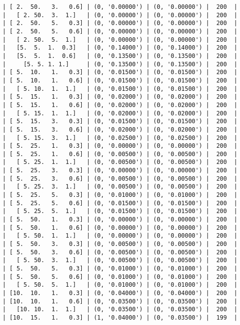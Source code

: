 \documentclass{article}
\begin{document}
\begin{verbatim}
| [ 2.  50.   3.   0.6] | (0, '0.00000') | (0, '0.00000') |  200  |
|   [ 2. 50.  3.  1.]   | (0, '0.00000') | (0, '0.00000') |  200  |
| [ 2.  50.   5.   0.3] | (0, '0.00000') | (0, '0.00000') |  200  |
| [ 2.  50.   5.   0.6] | (0, '0.00000') | (0, '0.00000') |  200  |
|   [ 2. 50.  5.  1.]   | (0, '0.00000') | (0, '0.00000') |  200  |
|   [5.  5.  1.  0.3]   | (0, '0.14000') | (0, '0.14000') |  200  |
|   [5.  5.  1.  0.6]   | (0, '0.13500') | (0, '0.13500') |  200  |
|     [5. 5. 1. 1.]     | (0, '0.13500') | (0, '0.13500') |  200  |
| [ 5.  10.   1.   0.3] | (0, '0.01500') | (0, '0.01500') |  200  |
| [ 5.  10.   1.   0.6] | (0, '0.01500') | (0, '0.01500') |  200  |
|   [ 5. 10.  1.  1.]   | (0, '0.01500') | (0, '0.01500') |  200  |
| [ 5.  15.   1.   0.3] | (0, '0.02000') | (0, '0.02000') |  200  |
| [ 5.  15.   1.   0.6] | (0, '0.02000') | (0, '0.02000') |  200  |
|   [ 5. 15.  1.  1.]   | (0, '0.02000') | (0, '0.02000') |  200  |
| [ 5.  15.   3.   0.3] | (0, '0.01500') | (0, '0.01500') |  200  |
| [ 5.  15.   3.   0.6] | (0, '0.02000') | (0, '0.02000') |  200  |
|   [ 5. 15.  3.  1.]   | (0, '0.02500') | (0, '0.02500') |  200  |
| [ 5.  25.   1.   0.3] | (0, '0.00000') | (0, '0.00000') |  200  |
| [ 5.  25.   1.   0.6] | (0, '0.00500') | (0, '0.00500') |  200  |
|   [ 5. 25.  1.  1.]   | (0, '0.00500') | (0, '0.00500') |  200  |
| [ 5.  25.   3.   0.3] | (0, '0.00000') | (0, '0.00000') |  200  |
| [ 5.  25.   3.   0.6] | (0, '0.00500') | (0, '0.00500') |  200  |
|   [ 5. 25.  3.  1.]   | (0, '0.00500') | (0, '0.00500') |  200  |
| [ 5.  25.   5.   0.3] | (0, '0.01000') | (0, '0.01000') |  200  |
| [ 5.  25.   5.   0.6] | (0, '0.01500') | (0, '0.01500') |  200  |
|   [ 5. 25.  5.  1.]   | (0, '0.01500') | (0, '0.01500') |  200  |
| [ 5.  50.   1.   0.3] | (0, '0.00000') | (0, '0.00000') |  200  |
| [ 5.  50.   1.   0.6] | (0, '0.00000') | (0, '0.00000') |  200  |
|   [ 5. 50.  1.  1.]   | (0, '0.00000') | (0, '0.00000') |  200  |
| [ 5.  50.   3.   0.3] | (0, '0.00500') | (0, '0.00500') |  200  |
| [ 5.  50.   3.   0.6] | (0, '0.00500') | (0, '0.00500') |  200  |
|   [ 5. 50.  3.  1.]   | (0, '0.00500') | (0, '0.00500') |  200  |
| [ 5.  50.   5.   0.3] | (0, '0.01000') | (0, '0.01000') |  200  |
| [ 5.  50.   5.   0.6] | (0, '0.01000') | (0, '0.01000') |  200  |
|   [ 5. 50.  5.  1.]   | (0, '0.01000') | (0, '0.01000') |  200  |
| [10.  10.   1.   0.3] | (0, '0.04000') | (0, '0.04000') |  200  |
| [10.  10.   1.   0.6] | (0, '0.03500') | (0, '0.03500') |  200  |
|   [10. 10.  1.  1.]   | (0, '0.03500') | (0, '0.03500') |  200  |
| [10.  15.   1.   0.3] | (1, '0.04000') | (0, '0.03500') |  199  |

\end{verbatim}
\end{document}
